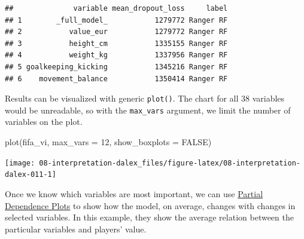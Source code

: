 \documentclass[
]{scrbook}
\newenvironment{Shaded}{\begin{snugshade}}{\end{snugshade}}
\newcommand{\AttributeTok}[1]{\textcolor[rgb]{0.77,0.63,0.00}{#1}}
\newcommand{\ConstantTok}[1]{\textcolor[rgb]{0.00,0.00,0.00}{#1}}
\newcommand{\DecValTok}[1]{\textcolor[rgb]{0.00,0.00,0.81}{#1}}
\newcommand{\FunctionTok}[1]{\textcolor[rgb]{0.00,0.00,0.00}{#1}}
\newcommand{\NormalTok}[1]{#1}
\newcommand{\OtherTok}[1]{\textcolor[rgb]{0.56,0.35,0.01}{#1}}
\newcommand{\SpecialCharTok}[1]{\textcolor[rgb]{0.00,0.00,0.00}{#1}}
\newcommand{\StringTok}[1]{\textcolor[rgb]{0.31,0.60,0.02}{#1}}
\renewenvironment{Shaded} {\begin{snugshade}\small} {\end{snugshade}}
\begin{document}
\begin{verbatim}
##              variable mean_dropout_loss     label
## 1        _full_model_           1279772 Ranger RF
## 2           value_eur           1279772 Ranger RF
## 3           height_cm           1335155 Ranger RF
## 4           weight_kg           1337956 Ranger RF
## 5 goalkeeping_kicking           1345216 Ranger RF
## 6    movement_balance           1350414 Ranger RF
\end{verbatim}

Results can be visualized with generic \texttt{plot()}. The chart for all 38 variables would be unreadable, so with the \texttt{max\_vars} argument, we limit the number of variables on the plot.

\begin{Shaded}
\begin{Highlighting}[]
\FunctionTok{plot}\NormalTok{(fifa\_vi, }\AttributeTok{max\_vars =} \DecValTok{12}\NormalTok{, }\AttributeTok{show\_boxplots =} \ConstantTok{FALSE}\NormalTok{)}
\end{Highlighting}
\end{Shaded}

\begin{center}\texttt{[image: 08-interpretation-dalex\_files/figure-latex/08-interpretation-dalex-011-1]} \end{center}

Once we know which variables are most important, we can use \href{https://pbiecek.github.io/ema/partialDependenceProfiles.html}{Partial Dependence Plots} to show how the model, on average, changes with changes in selected variables. In this example, they show the average relation between the particular variables and players' value.

\begin{Shaded}
\end{Shaded}
\end{document}
